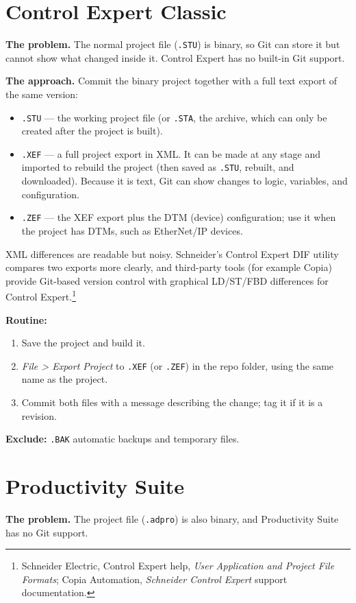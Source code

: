 \section{Control Expert Classic}
\textbf{The problem.} The normal project file (\texttt{.STU}) is binary, so Git can store it but cannot show what changed inside it. Control Expert has no built-in Git support.

\textbf{The approach.} Commit the binary project together with a full text export of the same version:
\begin{itemize}[itemsep=1pt]
  \item \texttt{.STU} --- the working project file (or \texttt{.STA}, the archive, which can only be created after the project is built).
  \item \texttt{.XEF} --- a full project export in XML. It can be made at any stage and imported to rebuild the project (then saved as \texttt{.STU}, rebuilt, and downloaded). Because it is text, Git can show changes to logic, variables, and configuration.
  \item \texttt{.ZEF} --- the XEF export plus the DTM (device) configuration; use it when the project has DTMs, such as EtherNet/IP devices.
\end{itemize}
XML differences are readable but noisy. Schneider's Control Expert DIF utility compares two exports more clearly, and third-party tools (for example Copia) provide Git-based version control with graphical LD/ST/FBD differences for Control Expert.\footnote{Schneider Electric, Control Expert help, \emph{User Application and Project File Formats}; Copia Automation, \emph{Schneider Control Expert} support documentation.}

\textbf{Routine:}
\begin{enumerate}[itemsep=1pt]
  \item Save the project and build it.
  \item \textit{File \textgreater{} Export Project} to \texttt{.XEF} (or \texttt{.ZEF}) in the repo folder, using the same name as the project.
  \item Commit both files with a message describing the change; tag it if it is a revision.
\end{enumerate}
\textbf{Exclude:} \texttt{.BAK} automatic backups and temporary files.

\section{Productivity Suite}
\textbf{The problem.} The project file (\texttt{.adpro}) is also binary, and Productivity Suite has no Git support.

